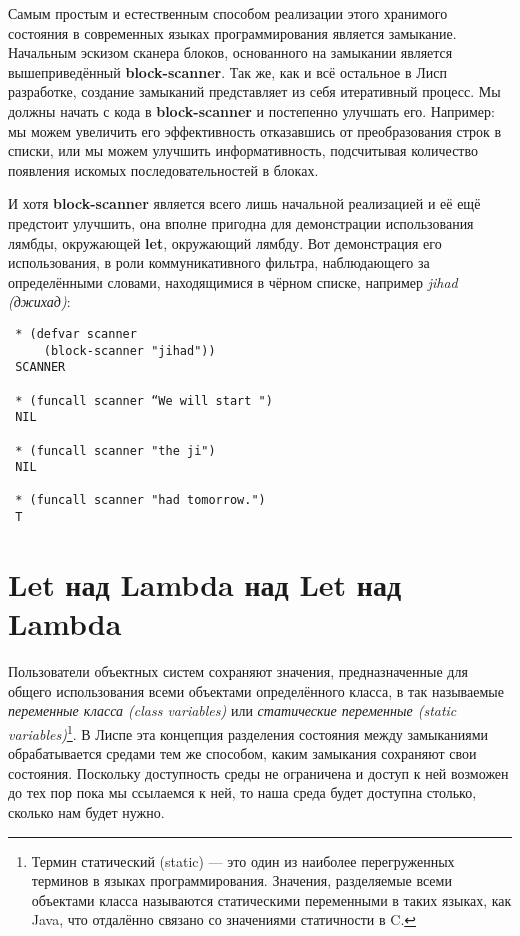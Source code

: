 Самым простым и естественным способом реализации этого хранимого состояния в современных языках программирования является замыкание. Начальным эскизом сканера блоков, основанного на замыкании является вышеприведённый \textbf{block-scanner}. Так же, как и всё остальное в Лисп разработке, создание замыканий представляет из себя итеративный процесс. Мы должны начать с кода в \textbf{block-scanner} и постепенно улучшать его. Например: мы можем увеличить его эффективность отказавшись от преобразования строк в списки, или мы можем улучшить информативность, подсчитывая количество появления искомых последовательностей в блоках.

И хотя \textbf{block-scanner} является всего лишь начальной реализацией и её ещё предстоит улучшить, она вполне пригодна для демонстрации использования лямбды, окружающей \textbf{let}, окружающий лямбду. Вот демонстрация его использования, в роли коммуникативного фильтра, наблюдающего за определёнными словами, находящимися в чёрном списке, например \emph{jihad (джихад)}:

\begin{verbatim}
 * (defvar scanner
     (block-scanner "jihad"))
 SCANNER

 * (funcall scanner “We will start ")
 NIL

 * (funcall scanner "the ji")
 NIL

 * (funcall scanner "had tomorrow.")
 T
\end{verbatim}

\section{Let над Lambda над Let над Lambda}\label{section_let_over_lambda_over_let_over_lambda}

Пользователи объектных систем сохраняют значения, предназначенные для общего использования всеми объектами определённого класса, в так называемые \emph{переменные класса (class variables)} или \emph{статические переменные (static variables)}\footnote{Термин статический (static) --- это один из наиболее перегруженных терминов в языках программирования. Значения, разделяемые всеми объектами класса называются статическими переменными в таких языках, как Java, что отдалённо связано со значениями статичности в C.}. В Лиспе эта концепция разделения состояния между замыканиями обрабатывается средами тем же способом, каким замыкания сохраняют свои состояния. Поскольку доступность среды не ограничена и доступ к ней возможен до тех пор пока мы ссылаемся к ней, то наша среда будет доступна столько, сколько нам будет нужно.

